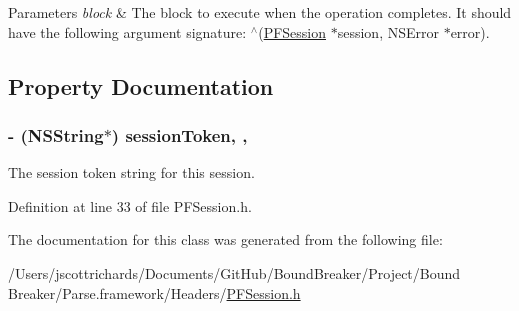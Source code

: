 \begin{DoxyParams}{Parameters}
{\em block} & The block to execute when the operation completes. It should have the following argument signature\+: {\ttfamily $^\wedge$(\hyperlink{interface_p_f_session}{P\+F\+Session} $\ast$session, N\+S\+Error $\ast$error)}. \\
\hline
\end{DoxyParams}


\subsection{Property Documentation}
\hypertarget{interface_p_f_session_a9e2e9da02a395f3b549cc0cca89e3baa}{}
\subsubsection[{session\+Token}]{\setlength{\rightskip}{0pt plus 5cm}-\/ (N\+S\+String$\ast$) session\+Token\hspace{0.3cm}{\ttfamily [read]}, {\ttfamily [nonatomic]}, {\ttfamily [copy]}}\label{interface_p_f_session_a9e2e9da02a395f3b549cc0cca89e3baa}
The session token string for this session. 

Definition at line 33 of file P\+F\+Session.\+h.



The documentation for this class was generated from the following file\+:\begin{DoxyCompactItemize}
\item 
/\+Users/jscottrichards/\+Documents/\+Git\+Hub/\+Bound\+Breaker/\+Project/\+Bound Breaker/\+Parse.\+framework/\+Headers/\hyperlink{_p_f_session_8h}{P\+F\+Session.\+h}\end{DoxyCompactItemize}
